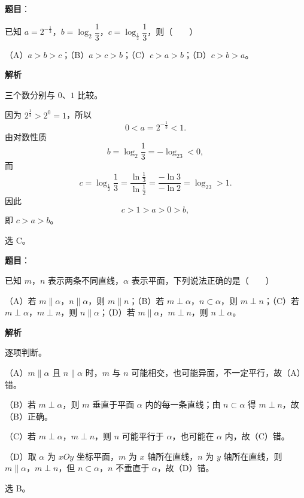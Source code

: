 \begin{answer}

\textbf{题目}：

已知 $a=2^{-\frac13}$，$b=\log_2\dfrac13$，$c=\log_{\frac12}\dfrac13$，则\mbox{（　　）}

（A）$a>b>c$；（B）$a>c>b$；（C）$c>a>b$；（D）$c>b>a$。

\textbf{解析}

三个数分别与 $0$、$1$ 比较。

因为 $2^{\frac13}>2^0=1$，所以
\nopagebreak[4]
\[0<a=2^{-\frac13}<1.\]
由对数性质
\nopagebreak[4]
\[b=\log_2\frac13=-\log_23<0,\]
而
\nopagebreak[4]
\[c=\log_{\frac12}\frac13=\frac{\ln\frac13}{\ln\frac12}
=\frac{-\ln3}{-\ln2}=\log_23>1.\]
因此
\nopagebreak[4]
\[c>1>a>0>b,\]
即 $c>a>b$。

选 C。


\end{answer}
\begin{answer}

\textbf{题目}：

已知 $m$，$n$ 表示两条不同直线，$\alpha$ 表示平面，下列说法正确的是\mbox{（　　）}

（A）若 $m\parallel\alpha$，$n\parallel\alpha$，则 $m\parallel n$；（B）若 $m\perp\alpha$，$n\subset\alpha$，则 $m\perp n$；（C）若 $m\perp\alpha$，$m\perp n$，则 $n\parallel\alpha$；（D）若 $m\parallel\alpha$，$m\perp n$，则 $n\perp\alpha$。

\textbf{解析}

逐项判断。

（A）$m\parallel\alpha$ 且 $n\parallel\alpha$ 时，$m$ 与 $n$ 可能相交，也可能异面，不一定平行，故（A）错。

（B）若 $m\perp\alpha$，则 $m$ 垂直于平面 $\alpha$ 内的每一条直线；由 $n\subset\alpha$ 得 $m\perp n$，故（B）正确。

（C）若 $m\perp\alpha$，$m\perp n$，则 $n$ 可能平行于 $\alpha$，也可能在 $\alpha$ 内，故（C）错。

（D）取 $\alpha$ 为 $xOy$ 坐标平面，$m$ 为 $x$ 轴所在直线，$n$ 为 $y$ 轴所在直线，则 $m\parallel\alpha$，$m\perp n$，但 $n\subset\alpha$，$n$ 不垂直于 $\alpha$，故（D）错。

选 B。


\end{answer}
